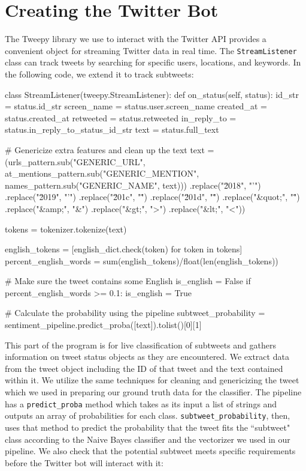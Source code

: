 \documentclass[11pt, twoside, reqno]{book}
\begin{document}
\section{Creating the Twitter Bot}
\label{creating_twitter_bot}

The Tweepy library we use to interact with the Twitter API provides a convenient object for streaming Twitter data in real time. The \verb|StreamListener| class can track tweets by searching for specific users, locations, and keywords. In the following code, we extend it to track subtweets:
\pagebreak
\begin{python}
class StreamListener(tweepy.StreamListener):
    def on_status(self, status):
        id_str = status.id_str
        screen_name = status.user.screen_name
        created_at = status.created_at
        retweeted = status.retweeted
        in_reply_to = status.in_reply_to_status_id_str
        text = status.full_text
        
        # Genericize extra features and clean up the text
        text = (urls_pattern.sub("GENERIC_URL", 
                at_mentions_pattern.sub("GENERIC_MENTION", 
                names_pattern.sub("GENERIC_NAME",
                text)))
                .replace("\u2018", "'")
                .replace("\u2019", "'")
                .replace("\u201c", "\"")
                .replace("\u201d", "\"")
                .replace("&quot;", "\"")
                .replace("&amp;", "&")
                .replace("&gt;", ">")
                .replace("&lt;", "<"))
        
        tokens = tokenizer.tokenize(text)
        
        english_tokens = [english_dict.check(token) for token in tokens]
        percent_english_words = sum(english_tokens)/float(len(english_tokens))
        
        # Make sure the tweet contains some English
        is_english = False
        if percent_english_words >= 0.1:
            is_english = True
        
        # Calculate the probability using the pipeline
        subtweet_probability = sentiment_pipeline.predict_proba([text]).tolist()[0][1]
\end{python}

\noindent
This part of the program is for live classification of subtweets and gathers information on tweet status objects as they are encountered. We extract data from the tweet object including the ID of that tweet and the text contained within it. We utilize the same techniques for cleaning and genericizing the tweet which we used in preparing our ground truth data for the classifier. The pipeline has a \verb|predict_proba| method which takes as its input a list of strings and outputs an array of probabilities for each class. \verb|subtweet_probability|, then, uses that method to predict the probability that the tweet fits the ``subtweet" class according to the Naive Bayes classifier and the vectorizer we used in our pipeline. We also check that the potential subtweet meets specific requirements before the Twitter bot will interact with it:
\end{document}
